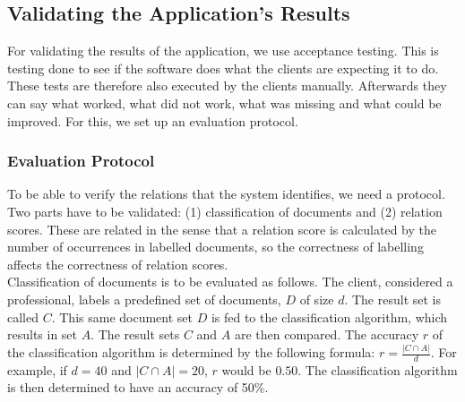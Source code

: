 \subsection{Validating the Application's Results}
For validating the results of the application, we use acceptance testing. This is testing done to see if the software does what the clients are expecting it to do. These tests are therefore also executed by the clients manually. Afterwards they can say what worked, what did not work, what was missing and what could be improved. For this, we set up an evaluation protocol.\\

\subsubsection{Evaluation Protocol}\label{sec:validation_protocol}
To be able to verify the relations that the system identifies, we need a protocol. Two parts have to be validated: (1) classification of documents and (2) relation scores. These are related in the sense that a relation score is calculated by the number of occurrences in labelled documents, so the correctness of labelling affects the correctness of relation scores.\\

Classification of documents is to be evaluated as follows. The client, considered a professional, labels a predefined set of documents, $D$ of size $d$. The result set is called $C$. This same document set $D$ is fed to the classification algorithm, which results in set $A$. The result sets $C$ and $A$ are then compared. The accuracy $r$ of the classification algorithm is determined by the following formula: $r = \frac{|C \cap A|}{d}$. For example, if $d=40$ and $|C \cap A|=20$, $r$ would be $0.50$. The classification algorithm is then determined to have an accuracy of 50\%.\\


